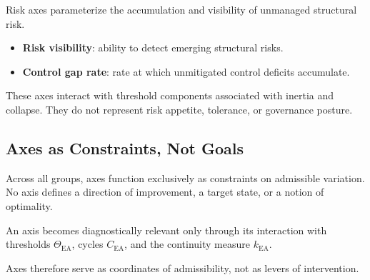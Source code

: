 Risk axes parameterize the accumulation and visibility of unmanaged
structural risk.

\begin{itemize}
  \item \textbf{Risk visibility}: ability to detect emerging structural
        risks.
  \item \textbf{Control gap rate}: rate at which unmitigated control
        deficits accumulate.
\end{itemize}

These axes interact with threshold components associated with inertia
and collapse.
They do not represent risk appetite, tolerance, or governance posture.

\subsection{Axes as Constraints, Not Goals}

Across all groups, axes function exclusively as constraints on
admissible variation.
No axis defines a direction of improvement, a target state, or a notion
of optimality.

An axis becomes diagnostically relevant only through its interaction
with thresholds $\Theta_{\mathrm{EA}}$, cycles $C_{\mathrm{EA}}$, and the
continuity measure $k_{\mathrm{EA}}$.

Axes therefore serve as coordinates of admissibility, not as levers of
intervention.

